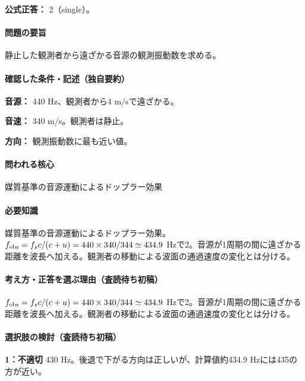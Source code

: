\textbf{公式正答：} 2（single）。

\paragraph{問題の要旨} 静止した観測者から遠ざかる音源の観測振動数を求める。

\paragraph{確認した条件・記述（独自要約）}\mbox{}\par

\noindent\textbf{音源：} 440 Hz、観測者から4 m/sで遠ざかる。\par

\noindent\textbf{音速：} 340 m/s。観測者は静止。\par

\noindent\textbf{方向：} 観測振動数に最も近い値。\par

\paragraph{問われる核心} 媒質基準の音源運動によるドップラー効果

\paragraph{必要知識} 媒質基準の音源運動によるドップラー効果。\(f_{\rm obs}=f_s c/(c+u)=440\times340/344\simeq434.9\) Hzで2。音源が1周期の間に遠ざかる距離を波長へ加える。観測者の移動による波面の通過速度の変化とは分ける。

\paragraph{考え方・正答を選ぶ理由（査読待ち初稿）} \(f_{\rm obs}=f_s c/(c+u)=440\times340/344\simeq434.9\) Hzで2。音源が1周期の間に遠ざかる距離を波長へ加える。観測者の移動による波面の通過速度の変化とは分ける。

\paragraph{選択肢の検討（査読待ち初稿）}\mbox{}\par

\noindent\textbf{1：不適切} 430 Hz。後退で下がる方向は正しいが、計算値約434.9 Hzには435の方が近い。\par

